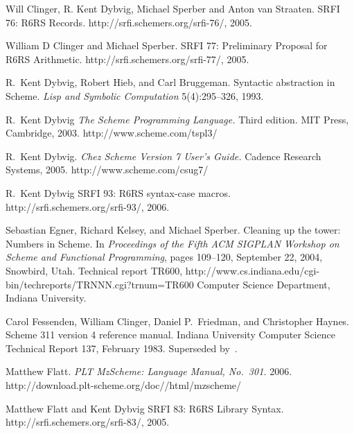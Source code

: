 \begin{thebibliography}{999}
Will Clinger, R. Kent Dybvig, Michael Sperber and Anton van Straaten.
SRFI 76: R6RS Records.
{\cf http://srfi.schemers.org/srfi-76/}, 2005.

William D Clinger and Michael Sperber.
SRFI 77: Preliminary Proposal for R6RS Arithmetic.
{\cf http://srfi.schemers.org/srfi-77/}, 2005.

R.~Kent Dybvig, Robert Hieb, and Carl Bruggeman.
Syntactic abstraction in Scheme.
{\em Lisp and Symbolic Computation} 5(4):295--326, 1993.

R.~Kent Dybvig
{\em The Scheme Programming Language.}
Third edition. MIT Press, Cambridge, 2003.
{\cf http://www.scheme.com/tspl3/}

R.~Kent Dybvig.
{\em Chez Scheme Version 7 User's Guide.}
Cadence Research Systems, 2005.
{\cf http://www.scheme.com/csug7/}

R.\ Kent Dybvig
SRFI 93: R6RS {\cf syntax-case} macros.
{\cf http://srfi.schemers.org/srfi-93/}, 2006.

Sebastian Egner, Richard Kelsey, and Michael Sperber.
Cleaning up the tower: Numbers in Scheme.
In {\em Proceedings of the Fifth ACM SIGPLAN
  Workshop on Scheme and Functional Programming},
pages 109--120,
September 22, 2004, Snowbird, Utah.
Technical report TR600,
{\cf http://www.cs.indiana.edu/\linebreak[1]cgi-bin/\linebreak[1]techreports/\linebreak[1]TRNNN.cgi?trnum=TR600}
Computer Science Department, Indiana University.

Carol Fessenden, William Clinger, Daniel P.~Friedman, and Christopher Haynes.
Scheme 311 version 4 reference manual.
Indiana University Computer Science Technical Report 137, February 1983.
Superseded by~\cite{Scheme84}.

Matthew Flatt.
{\em PLT MzScheme: Language Manual, No.~301.}
2006.
{\cf http://download.plt-scheme.org/\linebreak[1]doc//\linebreak[1]html/\linebreak[1]mzscheme/}

Matthew Flatt and Kent Dybvig
SRFI 83: R6RS Library Syntax.
{\cf http://srfi.schemers.org/\linebreak[1]srfi-83/}, 2005.
 

\end{thebibliography}
